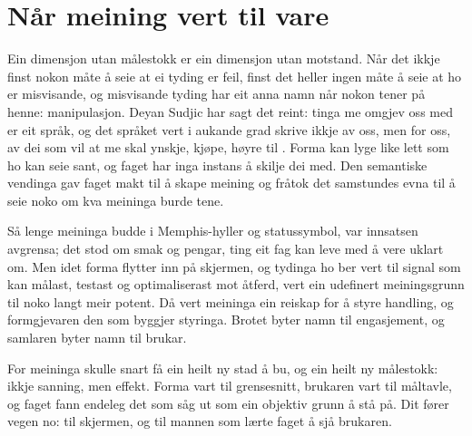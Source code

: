 \section{Når meining vert til vare}

Ein dimensjon utan målestokk er ein dimensjon utan motstand. Når det ikkje finst nokon måte å seie at ei tyding er feil, finst det heller ingen måte å seie at ho er misvisande, og misvisande tyding har eit anna namn når nokon tener på henne: manipulasjon. Deyan Sudjic har sagt det reint: tinga me omgjev oss med er eit språk, og det språket vert i aukande grad skrive ikkje av oss, men for oss, av dei som vil at me skal ynskje, kjøpe, høyre til \autocite{sudjic2008}. Forma kan lyge like lett som ho kan seie sant, og faget har inga instans å skilje dei med. Den semantiske vendinga gav faget makt til å skape meining og fråtok det samstundes evna til å seie noko om kva meininga burde tene.

Så lenge meininga budde i Memphis-hyller og statussymbol, var innsatsen avgrensa; det stod om smak og pengar, ting eit fag kan leve med å vere uklart om. Men idet forma flytter inn på skjermen, og tydinga ho ber vert til signal som kan målast, testast og optimaliserast mot åtferd, vert ein udefinert meiningsgrunn til noko langt meir potent. Då vert meininga ein reiskap for å styre handling, og formgjevaren den som byggjer styringa. Brotet byter namn til engasjement, og samlaren byter namn til brukar.

\vignett

For meininga skulle snart få ein heilt ny stad å bu, og ein heilt ny målestokk: ikkje sanning, men effekt. Forma vart til grensesnitt, brukaren vart til måltavle, og faget fann endeleg det som såg ut som ein objektiv grunn å stå på. Dit fører vegen no: til skjermen, og til mannen som lærte faget å sjå brukaren.


